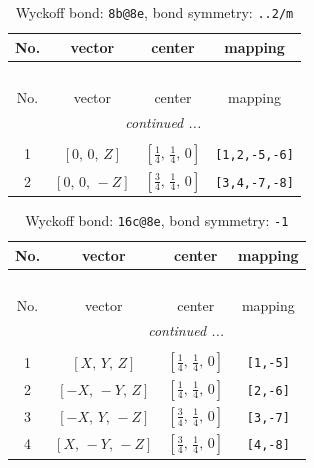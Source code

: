 \documentclass[fleqn,8pt]{jsarticle}
\begin{document}
\renewcommand{\arraystretch}{1.2}
\begin{longtable}{cccc}
\caption{Wyckoff bond: {\tt 8b@8e}, bond symmetry: {\tt ..2/m}}
 \\
 \hline \hline
No. & vector & center & mapping \\ \hline \endfirsthead

\multicolumn{3}{l}{\tablename\ \thetable{}} \\
 \hline \hline
No. & vector & center & mapping \\ \hline \endhead

 \hline \hline
\multicolumn{3}{r}{\footnotesize\it continued ...} \\ \endfoot

 \hline \hline
\multicolumn{3}{r}{} \\ \endlastfoot

1 & $\left[ 0,\, 0,\, Z \right]$ & $\left[ \frac{1}{4},\, \frac{1}{4},\, 0 \right]$ & {\tt [1,2,-5,-6]} \\ \hline
2 & $\left[ 0,\, 0,\, - Z \right]$ & $\left[ \frac{3}{4},\, \frac{1}{4},\, 0 \right]$ & {\tt [3,4,-7,-8]} \\
\end{longtable}
\renewcommand{\arraystretch}{1.2}
\begin{longtable}{cccc}
\caption{Wyckoff bond: {\tt 16c@8e}, bond symmetry: {\tt -1}}
 \\
 \hline \hline
No. & vector & center & mapping \\ \hline \endfirsthead

\multicolumn{3}{l}{\tablename\ \thetable{}} \\
 \hline \hline
No. & vector & center & mapping \\ \hline \endhead

 \hline \hline
\multicolumn{3}{r}{\footnotesize\it continued ...} \\ \endfoot

 \hline \hline
\multicolumn{3}{r}{} \\ \endlastfoot

1 & $\left[ X,\, Y,\, Z \right]$ & $\left[ \frac{1}{4},\, \frac{1}{4},\, 0 \right]$ & {\tt [1,-5]} \\ \hline
2 & $\left[ - X,\, - Y,\, Z \right]$ & $\left[ \frac{1}{4},\, \frac{1}{4},\, 0 \right]$ & {\tt [2,-6]} \\ \hline
3 & $\left[ - X,\, Y,\, - Z \right]$ & $\left[ \frac{3}{4},\, \frac{1}{4},\, 0 \right]$ & {\tt [3,-7]} \\ \hline
4 & $\left[ X,\, - Y,\, - Z \right]$ & $\left[ \frac{3}{4},\, \frac{1}{4},\, 0 \right]$ & {\tt [4,-8]} \\
\end{longtable}
\end{document}
